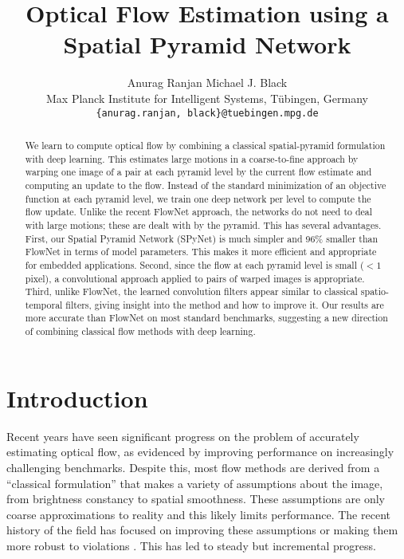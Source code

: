 \documentclass[10pt,twocolumn,letterpaper]{article}
\begin{document}
\title{Optical Flow Estimation using a Spatial Pyramid Network}

\author{Anurag Ranjan \quad \quad Michael J. Black\hspace{0.1in}\\ 
    Max Planck Institute for Intelligent Systems, T\"{u}bingen, Germany\\
    {\tt\small \{anurag.ranjan, black\}@tuebingen.mpg.de} 
       }


\maketitle

\begin{abstract}
We learn to compute optical flow by combining a classical spatial-pyramid formulation with deep learning.
This estimates large motions in a coarse-to-fine approach by
warping one image of a pair at each pyramid level by the current flow estimate and computing an update to the flow.
Instead of the standard minimization of an objective function at each
pyramid level, we train one deep network per level to compute the flow update.
Unlike the recent FlowNet approach, the networks do not need to deal with large motions; these are dealt with by the pyramid.  
This has several advantages. 
First, our Spatial Pyramid Network (SPyNet) is much simpler and  
96\% smaller than FlowNet in terms of model parameters.
This makes it more efficient and appropriate for embedded applications.
Second, since the flow at each pyramid
level is small ($< 1$ pixel), a convolutional approach applied to pairs of warped images is appropriate.
Third, unlike FlowNet, the learned convolution filters appear similar to classical spatio-temporal filters, 
giving insight into the method and how to improve it.
Our results are more accurate than FlowNet on most standard benchmarks, suggesting a new direction of combining classical flow methods with deep learning. 
\end{abstract}
\section{Introduction}
Recent years have seen significant progress on the problem of accurately estimating optical flow, as evidenced by improving performance on increasingly challenging benchmarks.
Despite this, most flow methods are derived from a ``classical formulation'' that makes a variety of assumptions about the image, from brightness constancy to spatial smoothness.
These assumptions are only coarse approximations to reality and this likely limits performance.
The recent history of the field has focused on improving these assumptions or making them more robust to violations \cite{black1993framework}.
This has led to steady but incremental progress.
\end{document}
